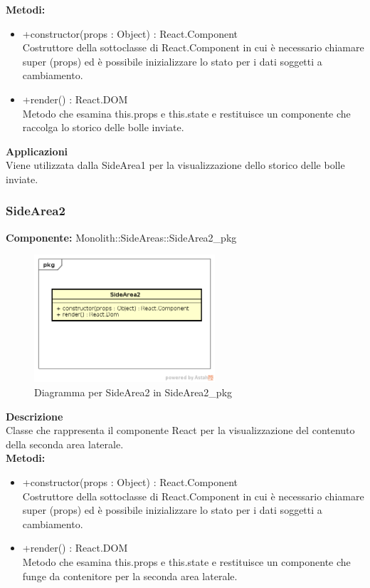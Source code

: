 \textbf{Metodi:} 
\begin{itemize}

\item +constructor(props : Object) : React.Component 
\\
Costruttore della sottoclasse di React.Component in cui è necessario chiamare super (props) ed è possibile inizializzare lo stato per i dati soggetti a cambiamento.

\item +render() : React.DOM 
\\
Metodo che esamina this.props e this.state e restituisce un componente che raccolga lo storico delle bolle inviate.

\end{itemize} 


\textbf{Applicazioni}\\
Viene utilizzata dalla SideArea1 per la visualizzazione dello storico delle bolle inviate. 


\clearpage

\subsubsection{SideArea2}
\textbf{Componente:}  Monolith::SideAreas::SideArea2\_pkg\\
   \FloatBarrier
   \begin{figure}[ht]
   \centering
   \includegraphics[width=0.6\textwidth]{img/single-SideArea2.png}
   \caption{{Diagramma per SideArea2 in SideArea2\_pkg}}
\end{figure}
\FloatBarrier
\textbf{Descrizione}\\
Classe che rappresenta il componente React per la visualizzazione del contenuto della seconda area laterale. \\
\textbf{Metodi:} 
\begin{itemize}

\item +constructor(props : Object) : React.Component 
\\
Costruttore della sottoclasse di React.Component in cui è necessario chiamare super (props) ed è possibile inizializzare lo stato per i dati soggetti a cambiamento.

\item +render() : React.DOM 
\\
Metodo che esamina this.props e this.state e restituisce un componente che funge da contenitore per la seconda area laterale.

\end{itemize} 



